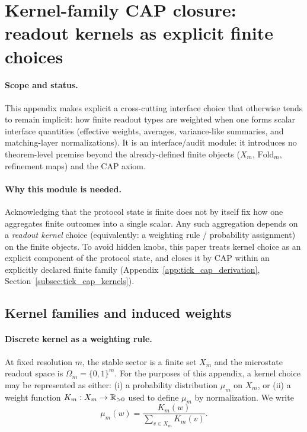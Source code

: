 \section{Kernel-family CAP closure: readout kernels as explicit finite choices}
\label{app:kernel_family_cap_closure}

\paragraph{Scope and status.}
\AuditTag This appendix makes explicit a cross-cutting interface choice that otherwise tends to remain implicit:
how finite readout types are weighted when one forms scalar interface quantities (effective weights, averages, variance-like summaries, and matching-layer normalizations).
It is an interface/audit module: it introduces no theorem-level premise beyond the already-defined finite objects ($X_m$, $\mathrm{Fold}_m$, refinement maps) and the CAP axiom.

\paragraph{Why this module is needed.}
\InterfaceTag Acknowledging that the protocol state is finite does not by itself fix how one aggregates finite outcomes into a single scalar.
Any such aggregation depends on a \emph{readout kernel} choice (equivalently: a weighting rule / probability assignment) on the finite objects.
To avoid hidden knobs, this paper treats kernel choice as an explicit component of the protocol state, and closes it by CAP within an explicitly declared finite family (Appendix~\ref{app:tick_cap_derivation}, Section~\ref{subsec:tick_cap_kernels}).

\subsection{Kernel families and induced weights}
\label{subsec:kernel_family_definitions}

\paragraph{Discrete kernel as a weighting rule.}
\InterfaceTag At fixed resolution $m$, the stable sector is a finite set $X_m$ and the microstate readout space is $\Omega_m=\{0,1\}^m$.
For the purposes of this appendix, a kernel choice may be represented as either:
(i) a probability distribution $\mu_m$ on $X_m$, or (ii) a weight function $K_m:X_m\to\mathbb{R}_{>0}$ used to define $\mu_m$ by normalization.
We write
\[
\mu_m(w)=\frac{K_m(w)}{\sum_{v\in X_m}K_m(v)}.
\]

